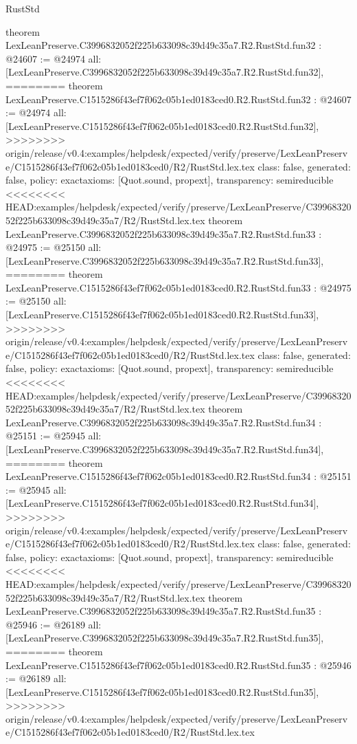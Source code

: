 \begin{lexlean}{RustStd}
\begin{coremodule}
{\begin{coremodule}
{{{{{{{{{{{{{{{{{{{{{{{{{{{{{{{{{{theorem LexLeanPreserve.C3996832052f225b633098c39d49c35a7.R2.RustStd.fun32 : @24607 := @24974 {
  all: [LexLeanPreserve.C3996832052f225b633098c39d49c35a7.R2.RustStd.fun32],
========
theorem LexLeanPreserve.C1515286f43ef7f062c05b1ed0183ced0.R2.RustStd.fun32 : @24607 := @24974 {
  all: [LexLeanPreserve.C1515286f43ef7f062c05b1ed0183ced0.R2.RustStd.fun32],
>>>>>>>> origin/release/v0.4:examples/helpdesk/expected/verify/preserve/LexLeanPreserve/C1515286f43ef7f062c05b1ed0183ced0/R2/RustStd.lex.tex
  class: false,
  generated: false,
  policy: exact{axioms: [Quot.sound, propext]},
  transparency: semireducible
}
<<<<<<<< HEAD:examples/helpdesk/expected/verify/preserve/LexLeanPreserve/C3996832052f225b633098c39d49c35a7/R2/RustStd.lex.tex
theorem LexLeanPreserve.C3996832052f225b633098c39d49c35a7.R2.RustStd.fun33 : @24975 := @25150 {
  all: [LexLeanPreserve.C3996832052f225b633098c39d49c35a7.R2.RustStd.fun33],
========
theorem LexLeanPreserve.C1515286f43ef7f062c05b1ed0183ced0.R2.RustStd.fun33 : @24975 := @25150 {
  all: [LexLeanPreserve.C1515286f43ef7f062c05b1ed0183ced0.R2.RustStd.fun33],
>>>>>>>> origin/release/v0.4:examples/helpdesk/expected/verify/preserve/LexLeanPreserve/C1515286f43ef7f062c05b1ed0183ced0/R2/RustStd.lex.tex
  class: false,
  generated: false,
  policy: exact{axioms: [Quot.sound, propext]},
  transparency: semireducible
}
<<<<<<<< HEAD:examples/helpdesk/expected/verify/preserve/LexLeanPreserve/C3996832052f225b633098c39d49c35a7/R2/RustStd.lex.tex
theorem LexLeanPreserve.C3996832052f225b633098c39d49c35a7.R2.RustStd.fun34 : @25151 := @25945 {
  all: [LexLeanPreserve.C3996832052f225b633098c39d49c35a7.R2.RustStd.fun34],
========
theorem LexLeanPreserve.C1515286f43ef7f062c05b1ed0183ced0.R2.RustStd.fun34 : @25151 := @25945 {
  all: [LexLeanPreserve.C1515286f43ef7f062c05b1ed0183ced0.R2.RustStd.fun34],
>>>>>>>> origin/release/v0.4:examples/helpdesk/expected/verify/preserve/LexLeanPreserve/C1515286f43ef7f062c05b1ed0183ced0/R2/RustStd.lex.tex
  class: false,
  generated: false,
  policy: exact{axioms: [Quot.sound, propext]},
  transparency: semireducible
}
<<<<<<<< HEAD:examples/helpdesk/expected/verify/preserve/LexLeanPreserve/C3996832052f225b633098c39d49c35a7/R2/RustStd.lex.tex
theorem LexLeanPreserve.C3996832052f225b633098c39d49c35a7.R2.RustStd.fun35 : @25946 := @26189 {
  all: [LexLeanPreserve.C3996832052f225b633098c39d49c35a7.R2.RustStd.fun35],
========
theorem LexLeanPreserve.C1515286f43ef7f062c05b1ed0183ced0.R2.RustStd.fun35 : @25946 := @26189 {
  all: [LexLeanPreserve.C1515286f43ef7f062c05b1ed0183ced0.R2.RustStd.fun35],
>>>>>>>> origin/release/v0.4:examples/helpdesk/expected/verify/preserve/LexLeanPreserve/C1515286f43ef7f062c05b1ed0183ced0/R2/RustStd.lex.tex
}}}}}}}}}}}}}}}}}}}}}}}}}}}}}}}}}}}}}}}
\end{coremodule}}
\end{coremodule}
\end{lexlean}
